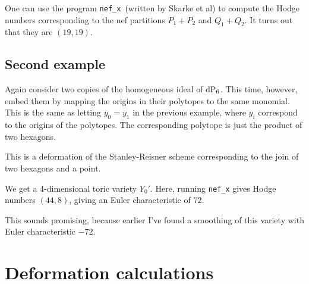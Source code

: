 \documentclass[11pt, english]{article}
\begin{document}
One can use the program \texttt{nef\_x} (written by Skarke et al) to compute the Hodge numbers corresponding to the nef partitions $P_1+P_2$ and $Q_1+Q_2$. It turns out that they are $(19,19)$.


\subsection{Second example}

Again consider two copies of the homogeneous ideal of $\dP6$. This time, however, embed them by mapping the origins in their polytopes to the same monomial. This is the same as letting $y_0=y_1$ in the previous example, where $y_i$ correspond to the origins of the polytopes. The corresponding polytope is just the product of two hexagons. 

\begin{remark}
This is a deformation of the Stanley-Reisner scheme corresponding to the join of two hexagons and a point.
\end{remark}

We get a 4-dimensional toric variety $Y_0'$. Here, running \texttt{nef\_x} gives Hodge numbers $(44,8)$, giving an Euler characteristic of $72$. 

\begin{remark}
This sounds promising, because earlier I've found a smoothing of this variety with Euler characteristic $-72$.
\end{remark}

\section{Deformation calculations}
\end{document}
